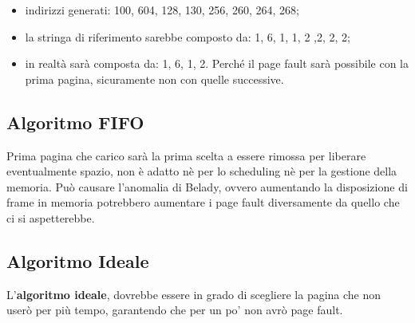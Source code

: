 \documentclass[a4paper, 12pt]{book}
\begin{document}
\begin{itemize}
    \item indirizzi generati: 100, 604, 128, 130, 256, 260, 264, 268;
    \item la stringa di riferimento sarebbe composto da: 1, 6, 1, 1, 2 ,2, 2, 2;
    \item in realtà sarà composta da: 1, 6, 1, 2. Perché il page fault sarà possibile con la prima pagina, sicuramente non con quelle successive.
\end{itemize}

\subsection{Algoritmo FIFO}

Prima pagina che carico sarà la prima scelta a essere rimossa per liberare  eventualmente spazio, non è adatto nè per lo scheduling 
nè per la gestione della memoria. Può causare l'anomalia di Belady, ovvero aumentando la disposizione di frame in memoria potrebbero 
aumentare i page fault diversamente da quello che ci si aspetterebbe.

\begin{figure}[h!]
    \centering
    \quad
\end{figure}

\subsection{Algoritmo Ideale}

L'\textbf{algoritmo ideale}, dovrebbe essere in grado di scegliere la pagina che non userò per più tempo, garantendo che per un po'
 non avrò page fault.
\end{document}
